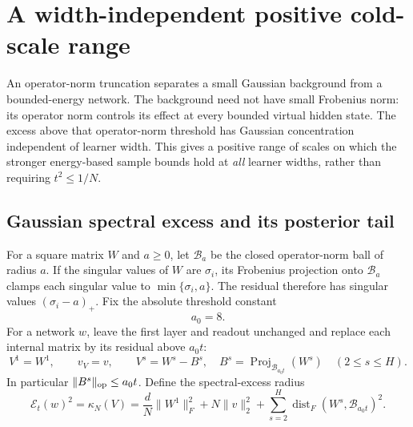 \section{A width-independent positive cold-scale range}
\label{app:spectral-cold}

An operator-norm truncation separates a small Gaussian background from
a bounded-energy network. The background need not have small Frobenius
norm: its operator norm controls its effect at every bounded virtual
hidden state. The excess above that operator-norm threshold has Gaussian
concentration independent of learner width. This gives a positive range
of scales on which the stronger energy-based sample bounds hold at
\emph{all} learner widths, rather than requiring $t^2\le1/N$.

\subsection{Gaussian spectral excess and its posterior tail}

For a square matrix $W$ and $a\ge0$, let $\mathcal B_a$ be the closed
operator-norm ball of radius $a$. If the singular values of $W$ are
$\sigma_i$, its Frobenius projection onto $\mathcal B_a$ clamps each
singular value to $\min\{\sigma_i,a\}$. The residual therefore has
singular values $(\sigma_i-a)_+$. Fix the absolute threshold constant
\[
 a_0=8.
\]
For a network $w$, leave the first layer and readout unchanged and
replace each internal matrix by its residual above $a_0t$:
\[
 V^1=W^1,\qquad v_V=v,\qquad
 V^s=W^s-B^s,\quad
 B^s=\operatorname{Proj}_{\mathcal B_{a_0t}}(W^s)
              \quad(2\le s\le H).
\]
In particular $\|B^s\|_{\rm op}\le a_0t$.
Define the spectral-excess radius
\begin{equation}\label{eq:spectral-radius}
 \mathcal E_t(w)^2=\kappa_N(V)
 =\frac dN\|W^1\|_F^2+N\|v\|_2^2
       +\sum_{s=2}^H
            \operatorname{dist}_F(W^s,\mathcal B_{a_0t})^2.
\end{equation}

